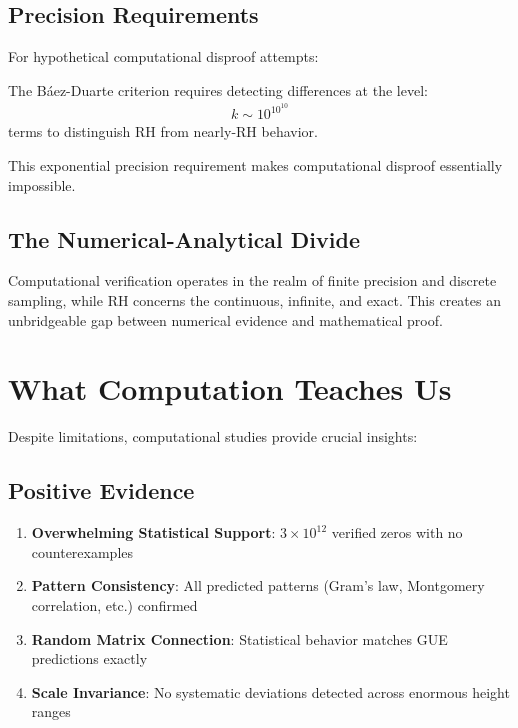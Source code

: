 \subsection{Precision Requirements}

For hypothetical computational disproof attempts:

\begin{example}
The Báez-Duarte criterion requires detecting differences at the level:
\begin{align}
k \sim 10^{10^{10}}
\end{align}
terms to distinguish RH from nearly-RH behavior.
\end{example}

This exponential precision requirement makes computational disproof essentially impossible.

\subsection{The Numerical-Analytical Divide}

\begin{remark}
Computational verification operates in the realm of finite precision and discrete sampling, while RH concerns the continuous, infinite, and exact. This creates an unbridgeable gap between numerical evidence and mathematical proof.
\end{remark}

\section{What Computation Teaches Us}
\label{sec:lessons}

Despite limitations, computational studies provide crucial insights:

\subsection{Positive Evidence}

\begin{enumerate}
\item \textbf{Overwhelming Statistical Support}: $3 \times 10^{12}$ verified zeros with no counterexamples
\item \textbf{Pattern Consistency}: All predicted patterns (Gram's law, Montgomery correlation, etc.) confirmed
\item \textbf{Random Matrix Connection}: Statistical behavior matches GUE predictions exactly
\item \textbf{Scale Invariance}: No systematic deviations detected across enormous height ranges
\end{enumerate}

